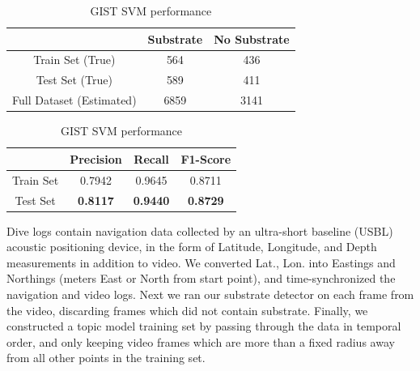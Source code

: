 \begin{table}[t]
    \begin{center}
      \begin{tabular}{|c|cc|}
      \hline
         & Substrate & No Substrate \\
        \hline\hline
        Train Set (True)         & 564  & 436 \\
        Test Set (True)          & 589  & 411 \\
        Full Dataset (Estimated) & 6859 & 3141\\
        \hline
      \end{tabular}
      \caption{Numbers of relevant and irrelevant frames in our example video.}
      \label{tab:detection-statistics}
    \end{center}

    \begin{center}
      \begin{tabular}{|c|ccc|}
        \hline
         & Precision & Recall & F1-Score\\
        \hline\hline
        Train Set & 0.7942 & 0.9645 & 0.8711\\
        Test Set  & \textbf{0.8117} & \textbf{0.9440} & \textbf{0.8729}\\
        \hline
      \end{tabular}
      \caption{Performance of GIST SVM substrate detector.}
      \label{tab:GIST-svm-performance} 
    \end{center}
  \caption{GIST SVM performance}   
\end{table}

Dive logs contain navigation data collected by an ultra-short baseline (USBL) acoustic positioning device, in the form of Latitude, Longitude, and Depth measurements in addition to video. We converted Lat., Lon. into Eastings and Northings (meters East or North from start point), and time-synchronized the navigation and video logs. Next we ran our substrate detector on each frame from the video, discarding frames which did not contain substrate. Finally, we constructed a topic model training set by passing through the data in temporal order, and only keeping video frames which are more than a fixed radius away from all other points in the training set.

